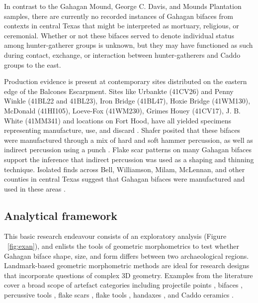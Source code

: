 \documentclass[review]{elsarticle}
\begin{document}
In contrast to the Gahagan Mound, George C. Davis, and Mounds Plantation samples, there are currently no recorded instances of Gahagan bifaces from contexts in central Texas that might be interpreted as mortuary, religious, or ceremonial. Whether or not these bifaces served to denote individual status among hunter-gatherer groups is unknown, but they may have functioned as such during contact, exchange, or interaction between hunter-gatherers and Caddo groups to the east.

Production evidence is present at contemporary sites distributed on the eastern edge of the Balcones Escarpment. Sites like Urbankte (41CV26) and Penny Winkle (41BL22 and 41BL23), Iron Bridge (41BL47), Hoxie Bridge (41WM130), McDonald (41HI105), Loeve-Fox (41WM230), Grimes Houey (41CV17), J. B. White (41MM341) and locations on Fort Hood, have all yielded specimens representing manufacture, use, and discard \citep{RN20717,RN11565,RN2708,RN20718,RN4924,RN20719}. Shafer posited that these bifaces were manufactured through a mix of hard and soft hammer percussion, as well as indirect percussion using a punch \citep{RN4924,RN3684}. Flake scar patterns on many Gahagan bifaces support the inference that indirect percussion was used as a shaping and thinning technique. Isolated finds across Bell, Williamson, Milam, McLennan, and other counties in central Texas suggest that Gahagan bifaces were manufactured and used in these areas \citep{RN4924}.

\subsection*{Analytical framework}

This basic research endeavour \citep{RN20851} consists of an exploratory analysis (Figure ~\ref{fig:exan}), and enlists the tools of geometric morphometrics to test whether Gahagan biface shape, size, and form differs between two archaeological regions. Landmark-based geometric morphometric methods are ideal for research designs that incorporate questions of complex 3D geometry. Examples from the literature cover a broad scope of artefact categories including projectile points \citep{RN1750,RN1755}, bifaces \citep{RN1727,RN4392,RN11550,RN11783}, percussive tools \citep{RN1772}, flake scars \citep{RN253}, flake tools \citep{RN11552}, handaxes \citep{RN1730,RN1766,RN3145,RN1733,RN335}, and Caddo ceramics \citep{RN1994,RN11521,RN11782,RN11801,RN11716,RN20852}. 
\end{document}
